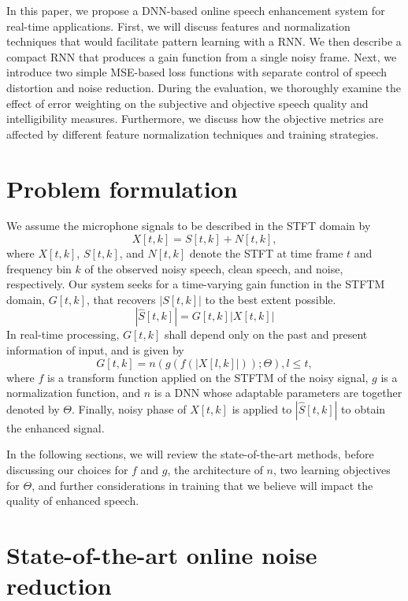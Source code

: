 \documentclass{article}
\begin{document}
In this paper, we propose a DNN-based online speech enhancement system for real-time applications. First, we will discuss features and normalization techniques that would facilitate pattern learning with a \ac{RNN}. We then describe a compact \ac{RNN} that produces a gain function from a single noisy frame. Next, we introduce two simple \ac{MSE}-based loss functions with separate control of speech distortion and noise reduction. During the evaluation, we thoroughly examine the effect of error weighting on the subjective and objective speech quality and intelligibility measures. Furthermore, we discuss how the objective metrics are affected by different feature normalization techniques and training strategies.
\section{Problem formulation}
\vspace{-1mm}
\label{sec:problem}
We assume the microphone signals to be described in the \ac{STFT} domain by
\begin{equation}
  X[t,k] = S[t,k] + N[t,k],
\end{equation}
where $X[t,k]$, $S[t,k]$, and $N[t,k]$ denote the \ac{STFT} at time frame $t$ and frequency bin $k$ of the observed noisy speech, clean speech, and noise, respectively. Our system seeks for a time-varying gain function in the \ac{STFTM} domain, $G[t,k]$, that recovers $|S[t,k]|$ to the best extent possible.
\begin{equation}
|\hat{S}[t,k]| = G[t,k]|X[t,k]|
\end{equation}
In real-time processing, $G[t,k]$ shall depend only on the past and present information of input, and is given by
\begin{equation}
G[t,k] = n(g(f(|X[l,k]|));\Theta), l \leq t,
\end{equation}
where $f$ is a transform function applied on the \ac{STFTM} of the noisy signal, $g$ is a normalization function, and $n$ is a DNN whose adaptable parameters are together denoted by $\Theta$. Finally, noisy phase of $X[t,k]$ is applied to $|\hat{S}[t,k]|$ to obtain the enhanced signal.

In the following sections, we will review the state-of-the-art methods, before discussing our choices for $f$ and $g$, the architecture of $n$, two learning objectives for $\Theta$, and further considerations in training that we believe will impact the quality of enhanced speech.

\section{State-of-the-art online noise reduction}
\label{sec:sota}
\end{document}

